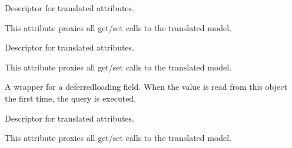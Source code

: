 \documentclass[letterpaper,10pt,english]{sphinxmanual}
\begin{document}
\begin{fulllineitems}
\begin{fulllineitems}
\label{\detokenize{index:bookings.models.SupplementMobileHome.bed_linen_rental}}
\pysigstartsignatures
\pysigline
{}
\pysigstopsignatures
\sphinxAtStartPar
Descriptor for translated attributes.

\sphinxAtStartPar
This attribute proxies all get/set calls to the translated model.

\end{fulllineitems}


\begin{fulllineitems}
\label{\detokenize{index:bookings.models.SupplementMobileHome.cleaning_deposit}}
\pysigstartsignatures
\pysigline
{}
\pysigstopsignatures
\sphinxAtStartPar
Descriptor for translated attributes.

\sphinxAtStartPar
This attribute proxies all get/set calls to the translated model.

\end{fulllineitems}


\begin{fulllineitems}
\label{\detokenize{index:bookings.models.SupplementMobileHome.id}}
\pysigstartsignatures
\pysigline
{}
\pysigstopsignatures
\sphinxAtStartPar
A wrapper for a deferred\sphinxhyphen{}loading field. When the value is read from this
object the first time, the query is executed.

\end{fulllineitems}


\begin{fulllineitems}
\label{\detokenize{index:bookings.models.SupplementMobileHome.mobile_home_deposit}}
\pysigstartsignatures
\pysigline
{}
\pysigstopsignatures
\sphinxAtStartPar
Descriptor for translated attributes.

\sphinxAtStartPar
This attribute proxies all get/set calls to the translated model.

\end{fulllineitems}


\end{fulllineitems}
\end{document}
